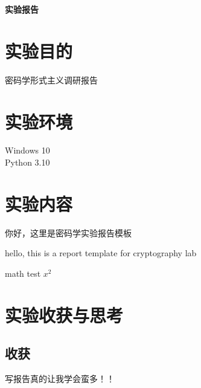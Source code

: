 \documentclass[UTF8]{ctexart}
\begin{document}


\begin{center}
    {\sourcehan\Huge\textbf{实验报告}}
\end{center}


\section{实验目的}
密码学形式主义调研报告


\section{实验环境}

Windows 10\\
Python 3.10


\section{实验内容}
你好，这里是密码学实验报告模板

hello, this is a report template for cryptography lab

math test $x^2$


 

\clearpage
\section{实验收获与思考}
\subsection{收获}
写报告真的让我学会蛮多！！


\end{document}
